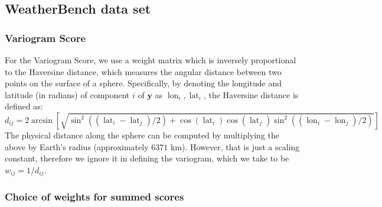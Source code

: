 \documentclass[twoside,11pt]{article}
\newcommand{\ddobs}{\mathbf{y}}
\begin{document}
	
	
	\subsection{WeatherBench data set}
	
	\subsubsection{Variogram Score}\label{app:weatherbench_Variogram}
	
	For the Variogram Score, we use a weight matrix which is inversely proportional to the Haversine distance, which measures the angular distance between two points on the surface of a sphere.
	Specifically, by denoting the longitude and latitude (in radians) of component $ i $ of $ \ddobs $ as $ \operatorname{lon}_i, \operatorname{lat}_i $, the Haversine distance is defined as: 	
	\begin{equation}\label{key}
	d_{ij} = 2\arcsin\left[\sqrt{\sin^2((\operatorname{lat}_i - \operatorname{lat}_j) / 2)
		+ \cos(\operatorname{lat}_i)\cos(\operatorname{lat}_j)\sin^2((\operatorname{lon}_i - \operatorname{lon}_j) / 2)}\right]
	\end{equation}
	The physical distance along the sphere can be computed by multiplying the above by Earth's radius (approximately $ 6371 $ km). However, that is just a scaling constant, therefore we ignore it in defining the variogram, which we take to be $ w_{ij} = 1/d_{ij}$.
	
	
	
	
	\subsubsection{Choice of weights for summed scores}\label{app:weatherbench_weights}
	
\end{document}
